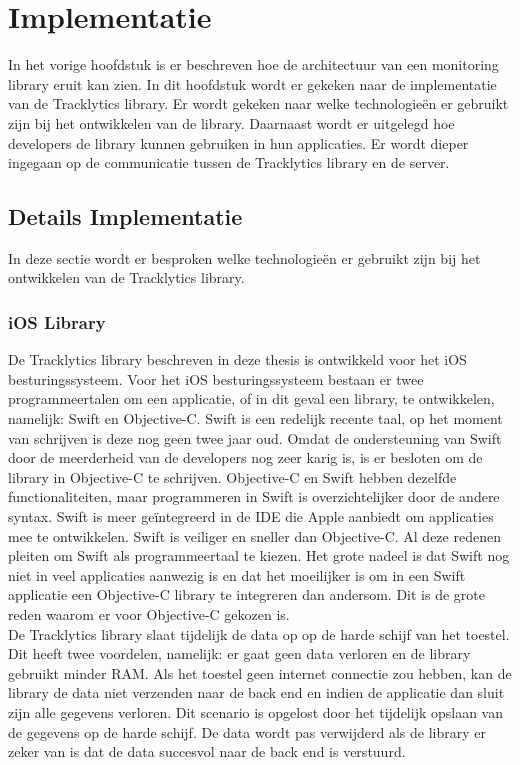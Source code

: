 \chapter{Implementatie}
In het vorige hoofdstuk is er beschreven hoe de architectuur van een monitoring library eruit kan zien. In dit hoofdstuk wordt er gekeken naar de implementatie van de Tracklytics library. %
Er wordt gekeken naar welke technologie\"en er gebruikt zijn bij het ontwikkelen van de library. Daarnaast wordt er uitgelegd hoe developers de library kunnen gebruiken in hun applicaties. Er wordt dieper ingegaan op de communicatie tussen de Tracklytics library en de server.

\section{Details Implementatie}
In deze sectie wordt er besproken welke technologie\"en er gebruikt zijn bij het ontwikkelen van de Tracklytics library.

\subsection{iOS Library}
De Tracklytics library beschreven in deze thesis is ontwikkeld voor het iOS besturingssysteem. Voor het iOS besturingssysteem bestaan er twee programmeertalen om een applicatie, of in dit geval een library, te ontwikkelen, namelijk: Swift en Objective-C. Swift is een redelijk recente taal, op het moment van schrijven is deze nog geen twee jaar oud. Omdat de ondersteuning van Swift door de meerderheid van de developers nog zeer karig is, is er besloten om de library in Objective-C te schrijven. Objective-C en Swift hebben dezelfde functionaliteiten, maar programmeren in Swift is overzichtelijker door de andere syntax. Swift is meer ge\"integreerd in de IDE die Apple aanbiedt om applicaties mee te ontwikkelen. Swift is veiliger en sneller dan Objective-C. Al deze redenen pleiten om Swift als programmeertaal te kiezen. Het grote nadeel is dat Swift nog niet in veel applicaties aanwezig is en dat het moeilijker is om in een Swift applicatie een Objective-C library te integreren dan andersom. Dit is de grote reden waarom er voor Objective-C gekozen is.\\

De Tracklytics library slaat tijdelijk de data op op de harde schijf van het toestel. Dit heeft twee voordelen, namelijk: er gaat geen data verloren en de library gebruikt minder RAM.
Als het toestel geen internet connectie zou hebben, kan de library de data niet verzenden naar de back end en indien de applicatie dan sluit zijn alle gegevens verloren. Dit scenario is opgelost door het tijdelijk opslaan van de gegevens op de harde schijf. De data wordt pas verwijderd als de library er zeker van is dat de data succesvol naar de back end is verstuurd. 


